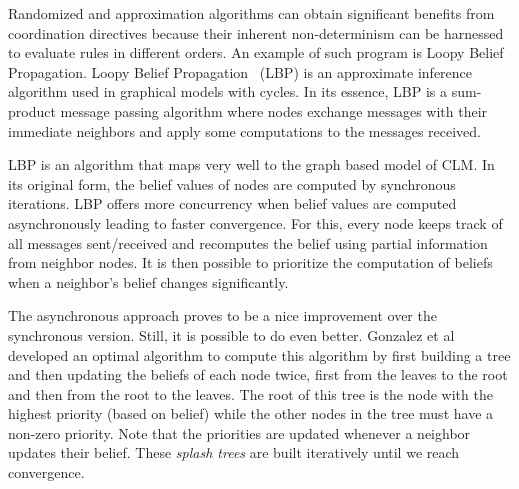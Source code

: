 Randomized and approximation algorithms can obtain significant benefits from
coordination directives because their inherent non-determinism can be harnessed
to evaluate rules in different orders.
An example of such program is Loopy Belief Propagation.
Loopy Belief Propagation~\cite{Murphy99loopybelief} (LBP) is an approximate inference algorithm
used in graphical models with cycles. In its essence, LBP is a sum-product message passing algorithm
where nodes exchange messages with their immediate neighbors and apply some computations to the messages
received.

LBP is an algorithm that maps very well to the graph based model of CLM. In its
original form, the belief values of nodes are computed by synchronous iterations.
LBP offers more concurrency when belief values are computed asynchronously
leading to faster convergence. For this, every node keeps track of all messages
sent/received and recomputes the belief using partial information from neighbor
nodes. It is then possible to prioritize the computation of beliefs when a
neighbor's belief changes significantly.

The asynchronous approach proves to be a nice improvement over the synchronous
version. Still, it is possible to do even better. Gonzalez et
al~\cite{Gonzalez+al:aistats09paraml} developed an optimal algorithm to compute
this algorithm by first building a tree and then updating the beliefs of each
node twice, first from the leaves to the root and then from the root to the
leaves. The root of this tree is the node with the highest priority (based on
belief) while the other nodes in the tree must have a non-zero priority.
Note that the priorities are updated whenever a neighbor updates their belief.
These \emph{splash trees} are built iteratively until we reach convergence.

